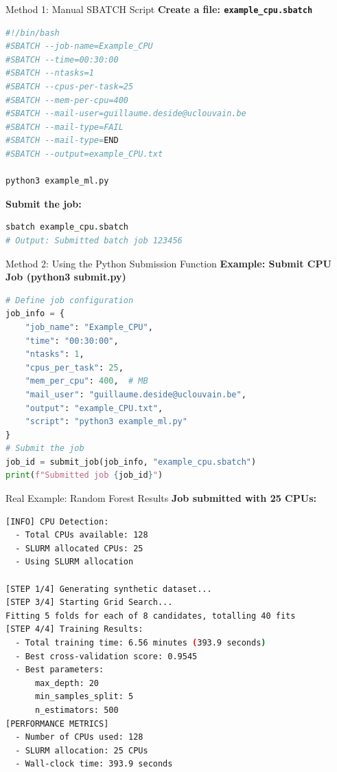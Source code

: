 \documentclass[aspectratio=169]{beamer}
\begin{document}
\begin{frame}[fragile]{Method 1: Manual SBATCH Script}
\textbf{Create a file: \texttt{example\_cpu.sbatch}}

\begin{lstlisting}[language=bash]
#!/bin/bash
#SBATCH --job-name=Example_CPU
#SBATCH --time=00:30:00
#SBATCH --ntasks=1
#SBATCH --cpus-per-task=25
#SBATCH --mem-per-cpu=400
#SBATCH --mail-user=guillaume.deside@uclouvain.be
#SBATCH --mail-type=FAIL
#SBATCH --mail-type=END
#SBATCH --output=example_CPU.txt

python3 example_ml.py
\end{lstlisting}

\vspace{0.2em}
\textbf{Submit the job:}
\begin{lstlisting}[language=bash]
sbatch example_cpu.sbatch
# Output: Submitted batch job 123456
\end{lstlisting}
\end{frame}

\begin{frame}[fragile]{Method 2: Using the Python Submission Function}
\textbf{Example: Submit CPU Job (python3 submit.py)}

\begin{lstlisting}[language=Python]
# Define job configuration
job_info = {
    "job_name": "Example_CPU",
    "time": "00:30:00",
    "ntasks": 1,
    "cpus_per_task": 25,
    "mem_per_cpu": 400,  # MB
    "mail_user": "guillaume.deside@uclouvain.be",
    "output": "example_CPU.txt",
    "script": "python3 example_ml.py"
}
# Submit the job
job_id = submit_job(job_info, "example_cpu.sbatch")
print(f"Submitted job {job_id}")
\end{lstlisting}


\end{frame}

\begin{frame}[fragile]{Real Example: Random Forest Results}
\textbf{Job submitted with 25 CPUs:}

\begin{lstlisting}[language=bash, basicstyle=\ttfamily\scriptsize]
[INFO] CPU Detection:
  - Total CPUs available: 128
  - SLURM allocated CPUs: 25
  - Using SLURM allocation
  
[STEP 1/4] Generating synthetic dataset...
[STEP 3/4] Starting Grid Search...
Fitting 5 folds for each of 8 candidates, totalling 40 fits
[STEP 4/4] Training Results:
  - Total training time: 6.56 minutes (393.9 seconds)
  - Best cross-validation score: 0.9545
  - Best parameters:
      max_depth: 20
      min_samples_split: 5
      n_estimators: 500
[PERFORMANCE METRICS]
  - Number of CPUs used: 128
  - SLURM allocation: 25 CPUs
  - Wall-clock time: 393.9 seconds
\end{lstlisting}
\end{frame}
\end{document}
